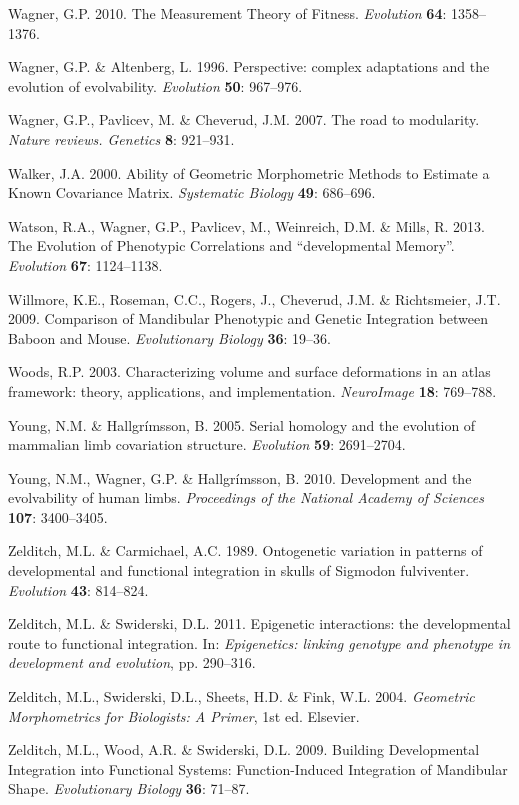 \documentclass[12pt,]{article}
\begin{document}
Wagner, G.P. 2010. The Measurement Theory of Fitness. \emph{Evolution}
\textbf{64}: 1358--1376.

Wagner, G.P. \& Altenberg, L. 1996. Perspective: complex adaptations and
the evolution of evolvability. \emph{Evolution} \textbf{50}: 967--976.

Wagner, G.P., Pavlicev, M. \& Cheverud, J.M. 2007. The road to
modularity. \emph{Nature reviews. Genetics} \textbf{8}: 921--931.

Walker, J.A. 2000. Ability of Geometric Morphometric Methods to Estimate
a Known Covariance Matrix. \emph{Systematic Biology} \textbf{49}:
686--696.

Watson, R.A., Wagner, G.P., Pavlicev, M., Weinreich, D.M. \& Mills, R.
2013. The Evolution of Phenotypic Correlations and ``developmental
Memory''. \emph{Evolution} \textbf{67}: 1124--1138.

Willmore, K.E., Roseman, C.C., Rogers, J., Cheverud, J.M. \&
Richtsmeier, J.T. 2009. Comparison of Mandibular Phenotypic and Genetic
Integration between Baboon and Mouse. \emph{Evolutionary Biology}
\textbf{36}: 19--36.

Woods, R.P. 2003. Characterizing volume and surface deformations in an
atlas framework: theory, applications, and implementation.
\emph{NeuroImage} \textbf{18}: 769--788.

Young, N.M. \& Hallgrímsson, B. 2005. Serial homology and the evolution
of mammalian limb covariation structure. \emph{Evolution} \textbf{59}:
2691--2704.

Young, N.M., Wagner, G.P. \& Hallgrímsson, B. 2010. Development and the
evolvability of human limbs. \emph{Proceedings of the National Academy
of Sciences} \textbf{107}: 3400--3405.

Zelditch, M.L. \& Carmichael, A.C. 1989. Ontogenetic variation in
patterns of developmental and functional integration in skulls of
Sigmodon fulviventer. \emph{Evolution} \textbf{43}: 814--824.

Zelditch, M.L. \& Swiderski, D.L. 2011. Epigenetic interactions: the
developmental route to functional integration. In: \emph{Epigenetics:
linking genotype and phenotype in development and evolution}, pp.
290--316.

Zelditch, M.L., Swiderski, D.L., Sheets, H.D. \& Fink, W.L. 2004.
\emph{Geometric Morphometrics for Biologists: A Primer}, 1st ed.
Elsevier.

Zelditch, M.L., Wood, A.R. \& Swiderski, D.L. 2009. Building
Developmental Integration into Functional Systems: Function-Induced
Integration of Mandibular Shape. \emph{Evolutionary Biology}
\textbf{36}: 71--87.
\end{document}
